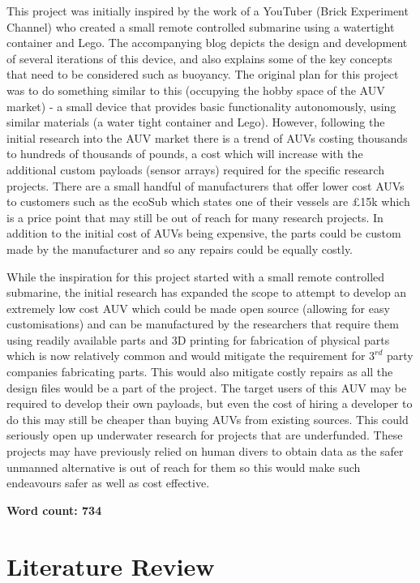 \documentclass[11pt,a4paper,titlepage]{report}
\begin{document}
	This project was initially inspired by the work of a YouTuber (Brick Experiment Channel\cite{BRICK_EXPERIMENT_CHANNEL_PROFILE}) who created a small remote controlled submarine using a watertight container and Lego. The accompanying blog\cite{BRICK_EXPERIMENT_CHANNEL_BLOG} depicts the design and development of several iterations of this device, and also explains some of the key concepts that need to be considered such as buoyancy. The original plan for this project was to do something similar to this (occupying the hobby space of the AUV market) - a small device that provides basic functionality autonomously, using similar materials (a water tight container and Lego). However, following the initial research into the AUV market there is a trend of AUVs costing thousands to hundreds of thousands\cite{AUV_COST} of pounds, a cost which will increase with the additional custom payloads (sensor arrays) required for the specific research projects. There are a small handful of manufacturers that offer lower cost AUVs to customers such as the ecoSub\cite{ECOSUB} which states one of their vessels are \unit{\approx}£15k which is a price point that may still be out of reach for many research projects. In addition to the initial cost of AUVs being expensive, the parts could be custom made by the manufacturer and so any repairs could be equally costly. 
	
	While the inspiration for this project started with a small remote controlled submarine, the initial research has expanded the scope to attempt to develop an extremely low cost AUV which could be made open source (allowing for easy customisations) and can be manufactured by the researchers that require them using readily available parts and 3D printing for fabrication of physical parts which is now relatively common and would mitigate the requirement for $3^{rd}$ party companies fabricating parts. This would also mitigate costly repairs as all the design files would be a part of the project. The target users of this AUV may be required to develop their own payloads, but even the cost of hiring a developer to do this may still be cheaper than buying AUVs from existing sources. This could seriously open up underwater research for projects that are underfunded. These projects may have previously relied on human divers to obtain data as the safer unmanned alternative is out of reach for them so this would make such endeavours safer as well as cost effective.  
	
	\textbf{Word count: 734}
	
	\chapter*{Literature Review}
 	
\end{document}
